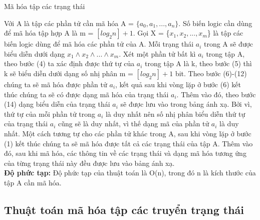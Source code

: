 \documentclass[a4paper,13pt,oneside,openany]{book}
\newenvironment{megaalgorithm}[1][htb]
{\renewcommand{\algorithmcfname}{Thuật toán}%
	\begin{algorithm}[#1]%
}{\end{algorithm}}
\begin{document}
\begin{flushleft}
\begin{megaalgorithm}[H]
			\caption{Mã hóa tập các trạng thái}
		\end{megaalgorithm}
		Với A là tập các phần tử cần mã hóa A = $\{a_0, a_1, ..., a_n\}$. Số biến logic cần dùng để mã hóa tập hợp A là m = $[log_{2}n] + 1$. Gọi X = \{$x_{1}, x_{2}, ..., x_{m}$\} là tập các biến logic dùng để mã hóa các phần tử của A. Mỗi trạng thái $a_i$ trong A sẽ được biểu diễn dưới dạng $x_{1}\land x_{2}\land...\land x_{m}$. Xét một phần tử bất kì $a_i$ trong tập A, theo bước (4) ta xác định được thứ tự của $a_i$ trong tập A là k, theo bước (5) thì k sẽ biểu diễn dưới dạng số nhị phân m = $[log_{2}n] + 1$ bit. Theo bước (6)-(12) chúng ta sẽ mã hóa được phần tử $a_i$, kết quả sau khi vòng lặp ở bước (6) kết thúc chúng ta sẽ có được dạng mã hóa của trạng thái $a_i$. Thêm vào đó, theo bước (14) dạng biểu diễn của trạng thái $a_i$ sẽ được lưu vào trong bảng ánh xạ. Bởi vì, thứ tự của mỗi phần tử trong $a_i$ là duy nhất nên số nhị phân biểu diễn thứ tự của trạng thái $a_i$ cũng sẽ là duy nhất, vì thế dạng mã của phần tử $a_i$ là duy nhất. Một cách tương tự cho các phần tử khác trong A, sau khi vòng lặp ở bước (1) kết thúc chúng ta sẽ mã hóa được tất cả các trạng thái của tập A. Thêm vào đó, sau khi mã hóa, các thông tin về các trạng thái và dạng mã hóa tương ứng của từng trạng thái này đều được lưu vào bảng ánh xạ.\\
		\textbf{Độ phức tạp:} Độ phức tạp của thuật toán là O(n), trong đó n là kích thước của tập A cần mã hóa.\\	
				
		\subsection{Thuật toán mã hóa tập các truyển trạng thái}
		\begin{megaalgorithm}[H]
			\SetAlgoLined
			\DontPrintSemicolon
				

\end{megaalgorithm}
\end{flushleft}
\end{document}
